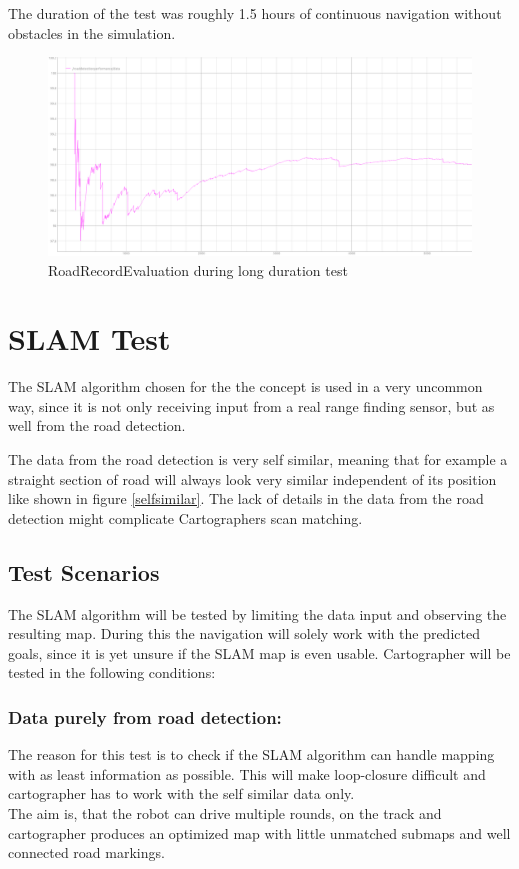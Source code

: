 The duration of the test was roughly 1.5 hours of continuous navigation without obstacles in the simulation.

\begin{figure}[H]
	\includegraphics[width=\textwidth]{Pictures/long duration road detection test}
	\caption{RoadRecordEvaluation during long duration test}
	\label{longdurroad}
\end{figure}

\section{SLAM Test}
The SLAM algorithm chosen for the the concept is used in a very uncommon way, since it is not only receiving input from a real range finding sensor, but as well from the road detection.

The data from the road detection is very self similar, meaning that for example a straight section of road will always look very similar independent of its position like shown in figure \ref{selfsimilar}. The lack of details in the data from the road detection might complicate Cartographers scan matching.\\

\subsection{Test Scenarios}
The SLAM algorithm will be tested by limiting the data input and observing the resulting map. During this the navigation will solely work with the predicted goals, since it is yet unsure if the SLAM map is even usable. Cartographer will be tested in the following conditions:

\subsubsection{Data purely from road detection:}
The reason for this test is to check if the SLAM algorithm can handle mapping with as least information as possible. This will make loop-closure difficult and cartographer has to work with the self similar data only.\\
The aim is, that the robot can drive multiple rounds, on the track and cartographer produces an optimized map with little unmatched submaps and well connected road markings.\\

